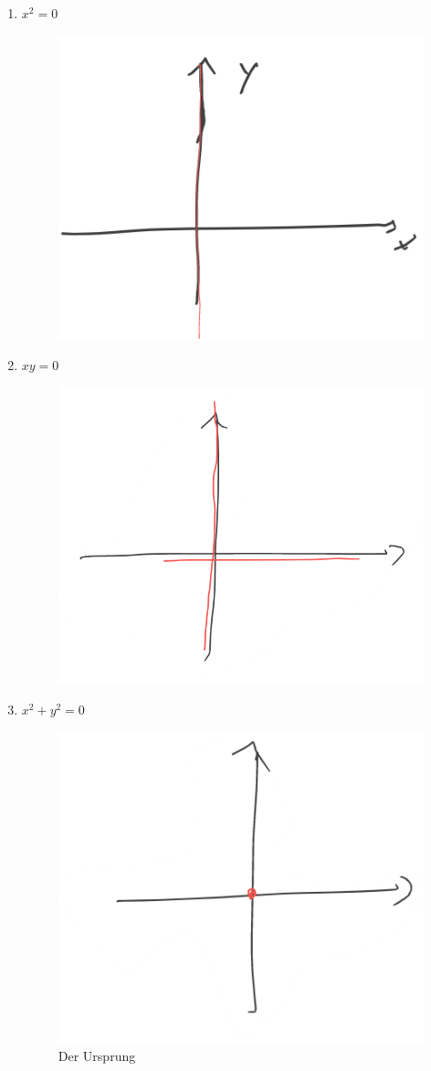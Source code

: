 \begin{beispiele*}[im \( \reals^2 \)]
\begin{enumerate}
\begin{figure}[H]
            \label{fig:quadriken_beispiel_hyperbeln}
        \end{figure}
        \item \( x^2=0 \)
        \begin{figure}[H]
            \centering
            \includegraphics[width=0.4\linewidth]{figures/quadriken_beispiel_y_achse}
            \label{fig:quadriken_beispiel_y_achse}
        \end{figure}
        \item \( xy=0 \)
        \begin{figure}[H]
            \centering
            \includegraphics[width=0.4\linewidth]{figures/quadriken_beispiel_x_achse_und_y_achse}
            \label{fig:quadriken_beispiel_x_achse_und_y_achse}
        \end{figure}
        \item \( x^2+y^2=0 \)
        \begin{figure}[H]
            \centering
            \includegraphics[width=0.4\linewidth]{figures/quadriken_beispiel_ursprung}
            \caption*{Der Ursprung}
            \label{fig:quadriken_beispiel_ursprung}
        \end{figure}
    \end{enumerate}
\end{beispiele*}
